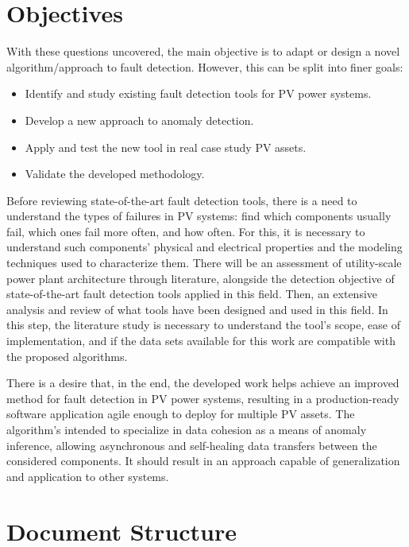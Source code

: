 \section{Objectives}

With these questions uncovered, the main objective is to adapt or design a novel algorithm/approach to fault detection. However, this can be split into finer goals:

\begin{itemize}
    \item  Identify and study existing fault detection tools for PV
    power systems.
    \item  Develop a new approach to anomaly detection.
    \item Apply and test the new tool in real case study PV assets.
    \item Validate the developed methodology.
\end{itemize}

Before reviewing state-of-the-art fault detection tools, there is a need to understand the types of failures in PV systems: find which components usually fail, which ones fail more often, and how often. For this, it is necessary to understand such components' physical and electrical properties and the modeling techniques used to characterize them. There will be an assessment of utility-scale power plant architecture through literature, alongside the detection objective of state-of-the-art fault detection tools applied in this field. Then, an extensive analysis and review of what tools have been designed and used in this field. In this step, the literature study is necessary to understand the tool's scope, ease of implementation, and if the data sets available for this work are compatible with the proposed algorithms.

There is a desire that, in the end, the developed work helps achieve an improved method for fault detection in PV power systems, resulting in a production-ready software application agile enough to deploy for multiple PV assets. The algorithm's intended to specialize in data cohesion as a means of anomaly inference, allowing asynchronous and self-healing data transfers between the considered components. It should result in an approach capable of generalization and application to other systems.

\section{Document Structure}


